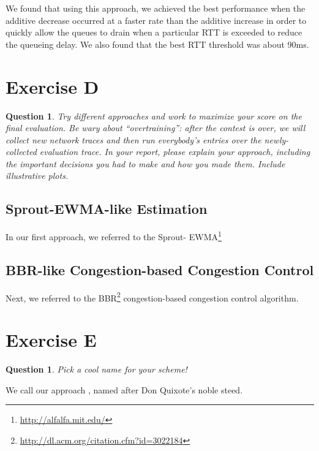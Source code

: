 \documentclass[twoside]{article}
\newtheorem{question}[theorem]{Question}
\begin{document}
We found that using this approach, we achieved the best performance when the
additive decrease occurred at a faster rate than the additive increase in order
to quickly allow the queues to drain when a particular RTT is exceeded to reduce
the queueing delay. We also found that the best RTT threshold was about 90ms.

\vfill
\pagebreak

\section*{Exercise D}
\begin{question}
  Try different approaches and work to maximize your score on the final
  evaluation. Be wary about ``overtraining'': after the contest is over, we
  will collect new network traces and then run everybody's entries over the
  newly-collected evaluation trace. In your report, please explain your
  approach, including the important decisions you had to make and how you made
  them. Include illustrative plots.
\end{question}

\subsection*{Sprout-EWMA-like Estimation}
In our first approach, we referred to the Sprout-
EWMA\footnote{\url{http://alfalfa.mit.edu/}}

\subsection*{BBR-like Congestion-based Congestion Control}
Next, we referred to the
BBR\footnote{\url{http://dl.acm.org/citation.cfm?id=3022184}}
congestion-based congestion control algorithm.

\vfill
\pagebreak

\section*{Exercise E}
\begin{question}
  Pick a cool name for your scheme!
\end{question}

We call our approach , named after Don Quixote's noble steed.

\end{document}
